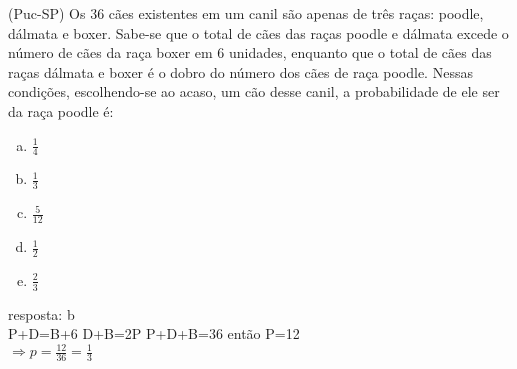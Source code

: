 \begin{ex}
(Puc-SP) Os 36 cães existentes em um canil são apenas de três raças: poodle, dálmata e boxer. Sabe-se que o total de cães das raças poodle e dálmata excede o número de cães da raça boxer em 6 unidades, enquanto que o total de cães das raças dálmata e boxer é o dobro do número dos cães de raça poodle. Nessas condições, escolhendo-se ao acaso, um cão desse canil, a probabilidade de ele ser da raça poodle é:
   \begin{enumerate}[(a)]
   \item $\frac{1}{4}$
   \item $\frac{1}{3}$
   \item $\frac{5}{12}$
   \item $\frac{1}{2}$
   \item $\frac{2}{3}$
   \end{enumerate}
     \begin{sol}
       resposta: b \\
       P+D=B+6 \hspace{0,5cm} D+B=2P \hspace{0,5cm} P+D+B=36 \hspace{0,5cm} então P=12 \\ 
       $\Longrightarrow p=\frac{12}{36}=\frac{1}{3}$
     \end{sol}
\end{ex}